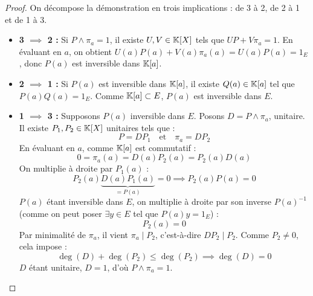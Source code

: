 \documentclass[11pt,a4paper]{report}
\begin{document}
\begin{proof}
    On décompose la démonstration en trois implications : de 3 à 2, de 2 à 1 et de 1 à 3.
    \begin{itemize}
        \item \textbf{3 $\implies$ 2 :} Si $P \wedge \pi_a = 1$, il existe $U,V \in \mathbb{K}[X]$ tels que $UP + V\pi_a = 1$. En évaluant en $a$, on obtient $U(a)P(a) + V(a)\pi_a(a) = U(a)P(a) = 1_E$, donc $P(a)$ est inversible dans $\mathbb{K}[a]$.
        \item \textbf{2 $\implies$ 1 :} Si $P(a)$ est inversible dans $\mathbb{K}[a]$, il existe $Q(a) \in \mathbb{K}[a]$ tel que $P(a)Q(a) = 1_E$. Comme $\mathbb{K}[a] \subset E$, $P(a)$ est inversible dans $E$.
        \item \textbf{1 $\implies$ 3 :} Supposons $P(a)$ inversible dans $E$.
        Posons $D = P \wedge \pi_a$, unitaire. Il existe $P_1, P_2 \in \mathbb{K}[X]$ unitaires tels que :
        \[
            P = D P_1 \quad \text{et} \quad \pi_a = D P_2
        \]
        En évaluant en $a$, comme $\mathbb{K}[a]$ est commutatif :
        \[
            0 = \pi_a(a) = D(a) P_2(a) = P_2(a) D(a)
        \]
        On multiplie à droite par $P_1(a)$ :
        \[
            P_2(a) \underbrace{D(a) P_1(a)}_{= P(a)} = 0 \implies P_2(a) P(a) = 0
        \]
        $P(a)$ étant inversible dans $E$, on multiplie à droite par son inverse $P(a)^{-1}$ (comme on peut poser $\exists y \in E$ tel que $P(a) y = 1_E$) :
        \[
            P_2(a) = 0
        \]
        Par minimalité de $\pi_a$, il vient $\pi_a \mid P_2$, c'est-à-dire $D P_2 \mid P_2$. 
        Comme $P_2 \neq 0$, cela impose :
        \[
            \deg(D) + \deg(P_2) \le \deg(P_2) \implies \deg(D) = 0
        \]
        $D$ étant unitaire, $D = 1$, d'où $P \wedge \pi_a = 1$.
    \end{itemize}
\end{proof}
\end{document}

